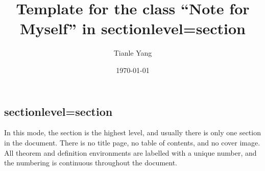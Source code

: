\documentclass{noteformyself}
\title{Template for the class ``Note for Myself'' in sectionlevel=section}
\author{Tianle Yang}
\date{\today}
\begin{document}
    \maketitle



    \subsection{sectionlevel=section}

    In this mode, the section is the highest level, and usually there is only one section in the document. 
    There is no title page, no table of contents, and no cover image.
    All theorem and definition environments are labelled with a unique number, and the numbering is continuous throughout the document.


\end{document}
